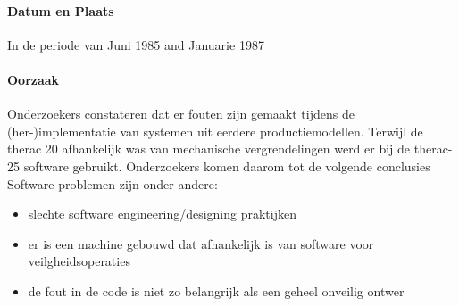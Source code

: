 \documentclass{article}
\begin{document}
	\paragraph{Datum en Plaats}
	In de periode van Juni 1985 and Januarie 1987 
	\paragraph{Oorzaak}
	\newline \indent  
	Onderzoekers constateren dat er fouten zijn gemaakt tijdens de (her-)implementatie van systemen uit eerdere productiemodellen.  
	Terwijl de therac 20 afhankelijk was van mechanische vergrendelingen werd er bij de therac-25 software gebruikt.
	Onderzoekers komen daarom tot de volgende conclusies
	Software problemen zijn onder andere:
	\begin{itemize}
		\item slechte software engineering/designing praktijken
		\item er is een machine gebouwd dat afhankelijk is van software voor veilgheidsoperaties
		\item de fout in de code is niet zo belangrijk als een geheel onveilig ontwer
	\end{itemize}
	
\end{document}
